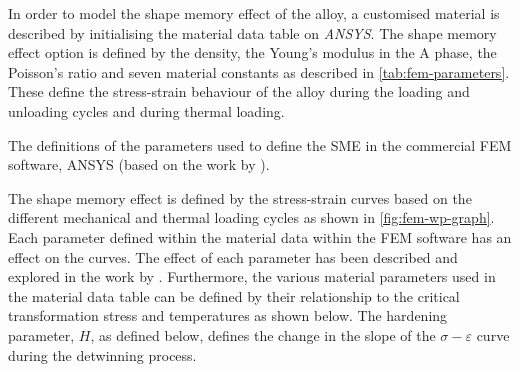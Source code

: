 In order to model the shape memory effect of the alloy, a customised material is described by initialising the material data table on \textit{ANSYS}. The shape memory effect option is defined by the density, the Young's modulus in the A phase, the Poisson's ratio and seven material constants as described in \cref{tab:fem-parameters}. These define the stress-strain behaviour of the alloy during the loading and unloading cycles and during thermal loading.

\begin{table}[hbt]
    \centering
    \caption{The definitions of the parameters used to define the SME in the commercial FEM software, ANSYS (based on the work by \cite{jaberAnsysParametersShape2018}).}
    \label{tab:fem-parameters}
    
\end{table}

The shape memory effect is defined by the stress-strain curves based on the different mechanical and thermal loading cycles as shown in \cref{fig:fem-wp-graph}. Each parameter defined within the material data within the FEM software has an effect on the curves. The effect of each parameter has been described and explored in the work by \cite{jaberAnsysParametersShape2018}. Furthermore, the various material parameters used in the material data table can be defined by their relationship to the critical transformation stress and temperatures as shown below. The hardening parameter, $H$, as defined below, defines the change in the slope of the $\sigma-\varepsilon$ curve during the detwinning process.

